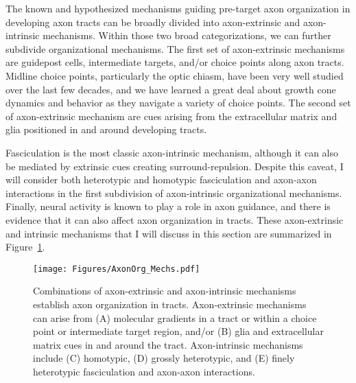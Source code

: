 \label{sec:MoleculesMechanisms}
The known and hypothesized mechanisms guiding pre-target axon organization in developing axon tracts can be broadly divided into axon-extrinsic and axon-intrinsic mechanisms.
Within those two broad categorizations, we can further subdivide organizational mechanisms.
The first set of axon-extrinsic mechanisms are guidepost cells, intermediate targets, and/or choice points along axon tracts.
Midline choice points, particularly the optic chiasm, have been very well studied over the last few decades, and we have learned a great deal about growth cone dynamics and behavior as they navigate a variety of choice points.
The second set of axon-extrinsic mechanism are cues arising from the extracellular matrix and glia positioned in and around developing tracts.

Fasciculation is the most classic axon-intrinsic mechanism, although it can also be mediated by extrinsic cues creating surround-repulsion.
Despite this caveat, I will consider both heterotypic and homotypic fasciculation and axon-axon interactions in the first subdivision of axon-intrinsic organizational mechanisms.
Finally, neural activity is known to play a role in axon guidance, and there is evidence that it can also affect axon organization in tracts.
These axon-extrinsic and intrinsic mechanisms that I will discuss in this section are summarized in Figure~\ref{AxonOrg_Mechs}.
\begin{figure}[hbtp]
    \begin{center}
    \texttt{[image: Figures/AxonOrg\_Mechs.pdf]}
    \caption[Common Mechanisms of Axon Organization in Tracts]{Combinations of axon-extrinsic and axon-intrinsic mechanisms establish axon organization in tracts. Axon-extrinsic mechanisms can arise from (A) molecular gradients in a tract or within a choice point or intermediate target region, and/or (B) glia and extracellular matrix cues in and around the tract. Axon-intrinsic mechanisms include (C) homotypic, (D) grossly heterotypic, and (E) finely heterotypic fasciculation and axon-axon interactions. \label{AxonOrg_Mechs}}
    \end{center}
\end{figure}

